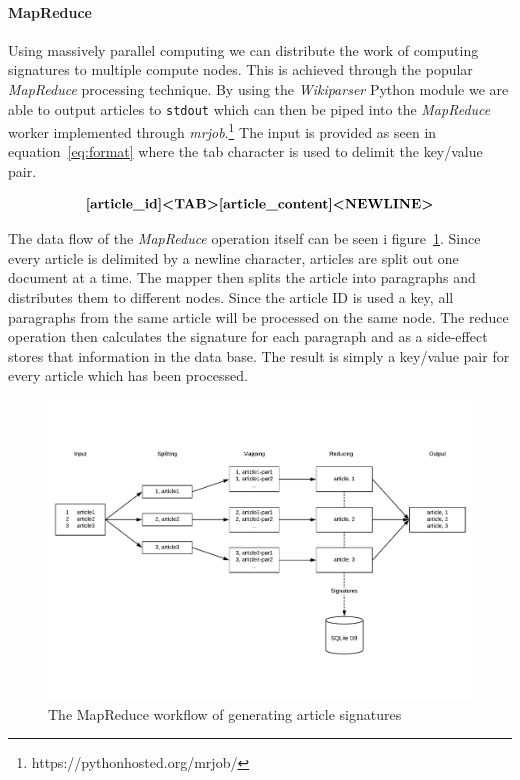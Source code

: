 \paragraph{MapReduce}
Using massively parallel computing we can distribute the work of computing signatures to multiple compute nodes. This is achieved through the popular \emph{MapReduce} processing technique. By using the \emph{Wikiparser} Python module we are able to output articles to \verb=stdout= which can then be piped into the \emph{MapReduce} worker implemented through \emph{mrjob}.\footnote{https://pythonhosted.org/mrjob/} The input is provided as seen in equation~\ref{eq:format} where the tab character is used to delimit the key/value pair.

\begin{equation}
    \textbf{[article\_id]}\textbf{\textless TAB\textgreater}\textbf{[article\_content]}\textbf{\textless NEWLINE\textgreater}
    \label{eq:format}
\end{equation}

The data flow of the \emph{MapReduce} operation itself can be seen i figure~\ref{fig:mapreduce}. Since every article is delimited by a newline character, articles are split out one document at a time. The mapper then splits the article into paragraphs and distributes them to different nodes. Since the article ID is used a key, all paragraphs from the same article will be processed on the same node. The reduce operation then calculates the signature for each paragraph and as a side-effect stores that information in the data base. The result is simply a key/value pair for every article which has been processed.

\begin{figure}[h]
	\centering
    \includegraphics[width = \linewidth]{docs/report/input/mapreduce.pdf}
    \captionsetup{width = \linewidth}
    \caption{The MapReduce workflow of generating article signatures}
    \label{fig:mapreduce}
\end{figure}

